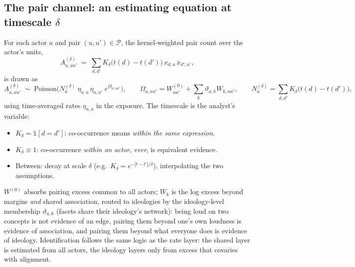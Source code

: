 \documentclass[11pt]{article}
\newcommand{\PP}{\mathcal{P}}
\newcommand{\1}{\mathbb{1}}
\begin{document}
\subsection*{The pair channel: an estimating equation at timescale $\delta$}
For each actor $a$ and pair $(u,u')\in\PP$, the kernel-weighted pair count over the actor's units,
\[
  A^{(\delta)}_{a,uu'}\;=\;\sum_{d,d'}K_\delta\big(t(d)-t(d')\big)\,x_{d,u}\,x_{d',u'},
\]
is drawn as
\[
  A^{(\delta)}_{a,uu'}\;\sim\;\text{Poisson}\Big(N^{(\delta)}_a\;\eta_{a,u}\,\eta_{a,u'}\;e^{\Omega_{a,uu'}}\Big),
  \qquad \Omega_{a,uu'}=W^{(0)}_{uu'}+\textstyle\sum_k\vartheta_{a,k}W_{k,uu'},
  \qquad N^{(\delta)}_a=\sum_{d,d'}K_\delta\big(t(d)-t(d')\big),
\]
using time-averaged rates $\eta_{a,u}$ in the exposure. The timescale is the analyst's variable:
\begin{itemize}
  \item $K_\delta=\1[d=d']$: co-occurrence means \emph{within the same expression}.
  \item $K_\delta\equiv1$: co-occurrence \emph{within an actor, ever}, is equivalent evidence.
  \item Between: decay at scale $\delta$ (e.g.\ $K_\delta=e^{-|t-t'|/\delta}$), interpolating the two assumptions.
\end{itemize}
$W^{(0)}$ absorbs pairing excess common to all actors; $W_k$ is the log excess beyond margins \emph{and} shared association, routed to ideologies by the ideology-level membership $\vartheta_{a,k}$ (facets share their ideology's network): being loud on two concepts is not evidence of an edge, pairing them beyond one's own loudness is evidence of association, and pairing them beyond what everyone does is evidence of ideology. Identification follows the same logic as the rate layer: the shared layer is estimated from all actors, the ideology layers only from excess that covaries with alignment.
\end{document}
